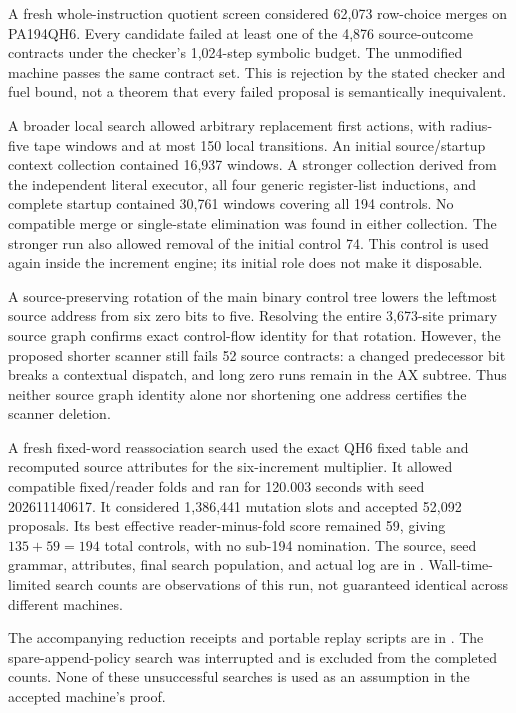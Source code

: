 A fresh whole-instruction quotient screen considered 62,073 row-choice
merges on PA194QH6. Every candidate failed at least one of the 4,876
source-outcome contracts under the checker's 1,024-step symbolic budget.
The unmodified machine passes the same contract set. This is rejection by
the stated checker and fuel bound, not a theorem that every failed proposal
is semantically inequivalent.

A broader local search allowed arbitrary replacement first actions, with
radius-five tape windows and at most 150 local transitions. An initial
source/startup context collection contained 16,937 windows. A stronger
collection derived from the independent literal executor, all four generic
register-list inductions, and complete startup contained 30,761 windows
covering all 194 controls. No compatible merge or single-state elimination
was found in either collection. The stronger run also allowed removal of
the initial control 74. This control is used again inside the increment
engine; its initial role does not make it disposable.

A source-preserving rotation of the main binary control tree lowers the
leftmost source address from six zero bits to five. Resolving the entire
3,673-site primary source graph confirms exact control-flow identity for
that rotation. However, the proposed shorter scanner still fails 52
source contracts: a changed predecessor bit breaks a contextual dispatch,
and long zero runs remain in the AX subtree. Thus neither source graph
identity alone nor shortening one address certifies the scanner deletion.

A fresh fixed-word reassociation search used the exact QH6 fixed table and
recomputed source attributes for the six-increment multiplier. It allowed
compatible fixed/reader folds and ran for 120.003 seconds with seed
202611140617. It considered 1,386,441 mutation slots and accepted 52,092
proposals. Its best effective reader-minus-fold score remained 59, giving
\(135+59=194\) total controls, with no sub-194 nomination. The source,
seed grammar, attributes, final search population, and actual log are in
. Wall-time-limited search counts are observations
of this run, not guaranteed identical across different machines.

The accompanying reduction receipts and portable replay scripts are in
. The spare-append-policy search was interrupted
and is excluded from the completed counts. None of these unsuccessful
searches is used as an assumption in the accepted machine's proof.
